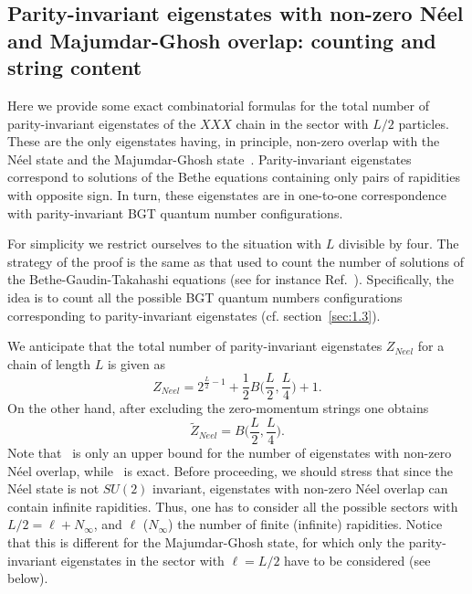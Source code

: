 \documentclass[11pt]{iopart}
\begin{document}
\subsection{Parity-invariant eigenstates with non-zero N\'eel and Majumdar-Ghosh overlap: 
counting and string content}
\label{app-1}

Here we provide some exact combinatorial formulas for the total number of 
parity-invariant eigenstates of the $XXX$ chain in the sector with $L/2$ 
particles. These are the only eigenstates having, in principle, non-zero 
overlap with the N\'eel state and the Majumdar-Ghosh state~\cite{brockmann-2014}. 
Parity-invariant eigenstates correspond to solutions of the Bethe equations 
containing only pairs of rapidities with opposite sign. In turn, these  
eigenstates are in one-to-one correspondence with parity-invariant BGT quantum number 
configurations. 

For simplicity we restrict ourselves to the situation with $L$ divisible by four. 
The strategy of the proof is the same as that used to count the number of solutions 
of the Bethe-Gaudin-Takahashi equations (see for instance Ref.~\cite{faddeev-1996}). 
Specifically, the idea is to count all the possible BGT quantum numbers configurations 
corresponding to parity-invariant eigenstates (cf. section~\ref{sec:1.3}). 

We anticipate that the total number of parity-invariant eigenstates $Z_{Neel}$ 
for a chain of length $L$ is given as 
%
\begin{equation}
\label{N-count}
Z_{Neel}=2^{\frac{L}{2}-1}+\frac{1}{2}B\Big(\frac{L}{2},\frac{L}{4}\Big)+1. 
\end{equation}
%
On the other hand, after excluding the zero-momentum strings one obtains 
%
\begin{equation}
\label{N-count-nz}
\widetilde Z_{Neel}=B\Big(\frac{L}{2},\frac{L}{4}\Big). 
\end{equation}
%
Note that~ is only an upper bound for the number of eigenstates 
with non-zero N\'eel overlap, while~ is exact. Before 
proceeding, we should stress that since the N\'eel state is not $SU(2)$ invariant, 
eigenstates with non-zero N\'eel overlap can contain infinite rapidities. Thus, 
one has to consider all the possible sectors with $L/2=\ell+N_{\infty}$, and $\ell$ 
($N_\infty$) the number of finite (infinite) rapidities. Notice that this 
is different for the Majumdar-Ghosh state, for which only the parity-invariant 
eigenstates in the sector with $\ell=L/2$ have to be considered (see below). 
\end{document}
